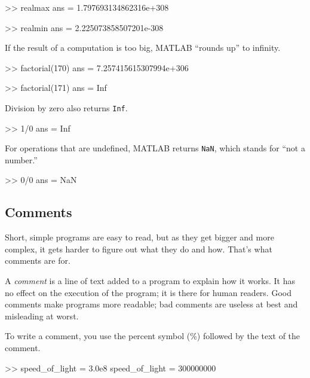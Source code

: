 
\begin{code}
>> realmax
ans = 1.797693134862316e+308

>> realmin
ans = 2.225073858507201e-308
\end{code}

If the result of a computation is too big, MATLAB ``rounds up''
to \mbox{infinity}.


\begin{code}
>> factorial(170)
ans = 7.257415615307994e+306

>> factorial(171)
ans = Inf
\end{code}

Division by zero also returns \lstinline{Inf}.

\begin{code}
>> 1/0
ans = Inf
\end{code}


For operations that are undefined, MATLAB returns \lstinline{NaN},
which stands for ``not a number.''


\begin{code}
>> 0/0
ans = NaN
\end{code}


\subsection{Comments}

Short, simple programs are easy to read, but as they get bigger and more complex, it gets harder to figure out what they do and how.  That's what comments are for.

A \emph{comment} is a line of text added to a program to explain how it works. It has no effect on the execution of the program; it is there for human readers.
Good comments make programs more readable; bad comments are useless at best and misleading at worst.

To write a comment, you use the percent symbol (\%) followed by the text of the comment.


\begin{code}
>> speed_of_light = 3.0e8     %
speed_of_light = 300000000
\end{code}

